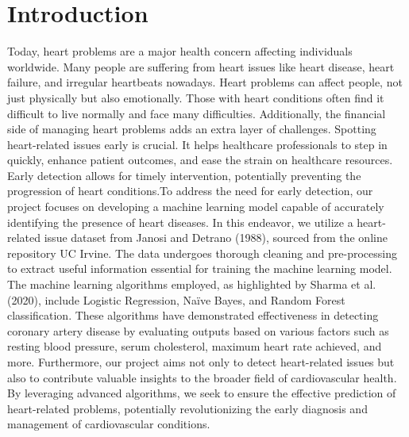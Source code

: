\chapter{Introduction}
\label{ch:into} %
Today, heart problems are a major health concern affecting individuals worldwide. Many people are suffering from heart issues like heart disease, heart failure, and irregular heartbeats nowadays. Heart problems can affect people, not just physically but also emotionally. Those with heart conditions often find it difficult to live normally and face many difficulties. Additionally, the financial side of managing heart problems adds an extra layer of challenges. Spotting heart-related issues early is crucial. It helps healthcare professionals to step in quickly, enhance patient outcomes, and ease the strain on healthcare resources. Early detection allows for timely intervention, potentially preventing the progression of heart conditions.To address the need for early detection, our project focuses on developing a machine learning model capable of accurately identifying the presence of heart diseases. In this endeavor, we utilize a heart-related issue dataset from Janosi and Detrano (1988), sourced from the online repository UC Irvine. The data undergoes thorough cleaning and pre-processing to extract useful information essential for training the machine learning model. The machine learning algorithms employed, as highlighted by Sharma et al. (2020), include Logistic Regression, Naïve Bayes, and Random Forest classification. These algorithms have demonstrated effectiveness in detecting coronary artery disease by evaluating outputs based on various factors such as resting blood pressure, serum cholesterol, maximum heart rate achieved, and more. Furthermore, our project aims not only to detect heart-related issues but also to contribute valuable insights to the broader field of cardiovascular health. By leveraging advanced algorithms, we seek to ensure the effective prediction of heart-related problems, potentially revolutionizing the early diagnosis and management of cardiovascular conditions.
